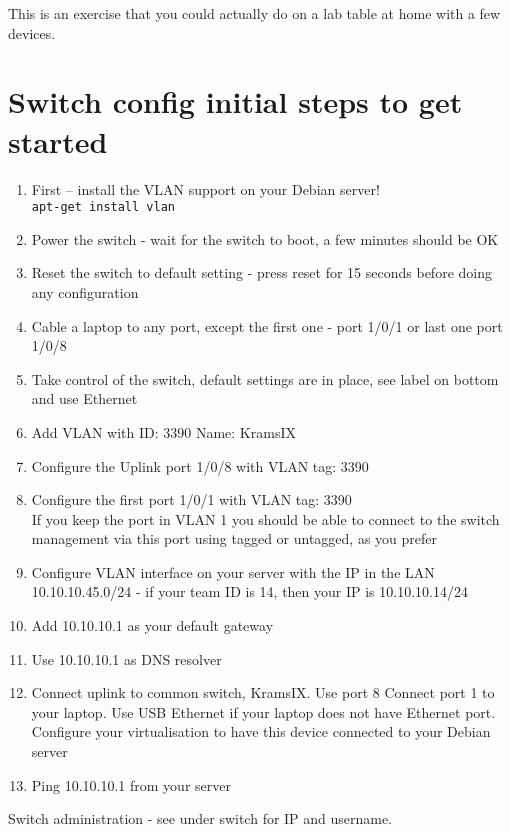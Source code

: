 \documentclass[a4paper,11pt,notitlepage]{report}
\begin{document}
This is an exercise that you could actually do on a lab table at home with a few devices.

\eject
\section*{Switch config initial steps to get started}

\begin{enumerate}
\item First -- install the VLAN support on your Debian server!\\
\verb+apt-get install vlan+
\vskip 2cm
\item Power the switch - wait for the switch to boot, a few minutes should be OK
\item Reset the switch to default setting - press reset for 15 seconds before doing any configuration
\item Cable a laptop to any port, except the first one - port 1/0/1 or last one port 1/0/8
\item Take control of the switch, default settings are in place, see label on bottom and use Ethernet
\item Add VLAN with ID: 3390 Name: KramsIX

\item Configure the Uplink port 1/0/8 with VLAN tag: 3390
\item Configure the first port 1/0/1 with VLAN tag: 3390\\
If you keep the port in VLAN 1 you should be able to connect to the switch management via this port using tagged or untagged, as you prefer \smiley
\item Configure VLAN interface on your server with the IP in the LAN 10.10.10.45.0/24 - if your team ID is 14, then your IP is 10.10.10.14/24
\item Add 10.10.10.1 as your default gateway
\item Use 10.10.10.1 as DNS resolver

\vskip 2cm
\item Connect uplink to common switch, KramsIX. Use port 8
Connect port 1 to your laptop. Use USB Ethernet if your laptop does not have Ethernet port. Configure your virtualisation to have this device connected to your Debian server
\item Ping 10.10.10.1 from your server
\end{enumerate}

Switch administration - see under switch for IP and username.
\end{document}
